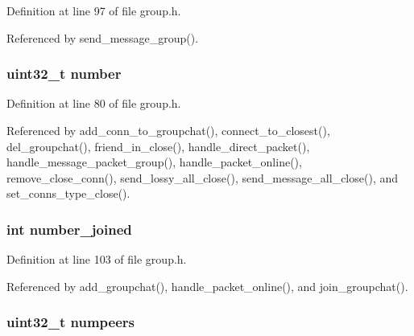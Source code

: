 Definition at line 97 of file group.\+h.



Referenced by send\+\_\+message\+\_\+group().

\hypertarget{struct_group__c_ad50c630d233a71112a7df136970caefc}{
\subsubsection[{number}]{\setlength{\rightskip}{0pt plus 5cm}uint32\+\_\+t number}}\label{struct_group__c_ad50c630d233a71112a7df136970caefc}


Definition at line 80 of file group.\+h.



Referenced by add\+\_\+conn\+\_\+to\+\_\+groupchat(), connect\+\_\+to\+\_\+closest(), del\+\_\+groupchat(), friend\+\_\+in\+\_\+close(), handle\+\_\+direct\+\_\+packet(), handle\+\_\+message\+\_\+packet\+\_\+group(), handle\+\_\+packet\+\_\+online(), remove\+\_\+close\+\_\+conn(), send\+\_\+lossy\+\_\+all\+\_\+close(), send\+\_\+message\+\_\+all\+\_\+close(), and set\+\_\+conns\+\_\+type\+\_\+close().

\hypertarget{struct_group__c_a50fa99a57ee7c9280fc90b7c33d760d0}{
\subsubsection[{number\+\_\+joined}]{\setlength{\rightskip}{0pt plus 5cm}int number\+\_\+joined}}\label{struct_group__c_a50fa99a57ee7c9280fc90b7c33d760d0}


Definition at line 103 of file group.\+h.



Referenced by add\+\_\+groupchat(), handle\+\_\+packet\+\_\+online(), and join\+\_\+groupchat().

\hypertarget{struct_group__c_a6c81294c96de8914431dbf825934b528}{
\subsubsection[{numpeers}]{\setlength{\rightskip}{0pt plus 5cm}uint32\+\_\+t numpeers}}\label{struct_group__c_a6c81294c96de8914431dbf825934b528}


